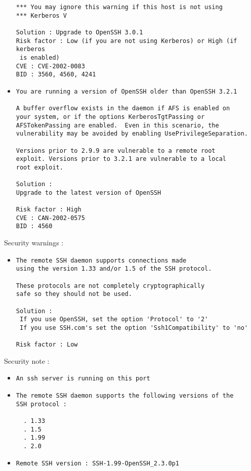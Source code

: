 \documentclass{article}
\begin{document}
\begin{itemize}
\begin{verbatim}
*** You may ignore this warning if this host is not using
*** Kerberos V

Solution : Upgrade to OpenSSH 3.0.1
Risk factor : Low (if you are not using Kerberos) or High (if kerberos
 is enabled)
CVE : CVE-2002-0083
BID : 3560, 4560, 4241
\end{verbatim}\item \begin{verbatim}
You are running a version of OpenSSH older than OpenSSH 3.2.1

A buffer overflow exists in the daemon if AFS is enabled on
your system, or if the options KerberosTgtPassing or
AFSTokenPassing are enabled.  Even in this scenario, the
vulnerability may be avoided by enabling UsePrivilegeSeparation.

Versions prior to 2.9.9 are vulnerable to a remote root
exploit. Versions prior to 3.2.1 are vulnerable to a local
root exploit.

Solution :
Upgrade to the latest version of OpenSSH

Risk factor : High
CVE : CAN-2002-0575
BID : 4560
\end{verbatim}\end{itemize}
Security warnings :\\
\begin{itemize}
\item \begin{verbatim}
The remote SSH daemon supports connections made
using the version 1.33 and/or 1.5 of the SSH protocol.

These protocols are not completely cryptographically
safe so they should not be used.

Solution : 
 If you use OpenSSH, set the option 'Protocol' to '2'
 If you use SSH.com's set the option 'Ssh1Compatibility' to 'no'
  
Risk factor : Low
\end{verbatim}\end{itemize}
Security note :\\
\begin{itemize}
\item \begin{verbatim}
An ssh server is running on this port
\end{verbatim}\item \begin{verbatim}
The remote SSH daemon supports the following versions of the
SSH protocol :

  . 1.33
  . 1.5
  . 1.99
  . 2.0

\end{verbatim}\item \begin{verbatim}
Remote SSH version : SSH-1.99-OpenSSH_2.3.0p1
\end{verbatim}\end{itemize}
\end{document}
